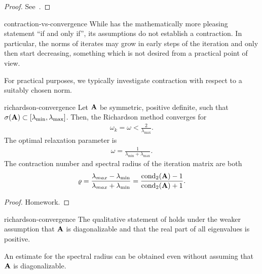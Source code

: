 \begin{proof}
  See~\cite[Theorem 3.1]{Rannacher18nla}.
\end{proof}

\begin{Remark}{contraction-vs-convergence}
  While  has the
  mathematically more pleasing statement ``if and only if'', its
  assumptions do not establish a contraction. In particular, the norms
  of iterates may grow in early steps of the iteration and only then
  start decreasing, something which is not desired from a practical
  point of view.

  For practical purposes, we typically investigate contraction with
  respect to a suitably chosen norm.
\end{Remark}

\begin{Theorem}{richardson-convergence}
  Let $\mathbf A$ be symmetric, positive definite, such that
  $\sigma(\mathbf A)\subset [\lambda_{\min},\lambda_{\max}]$. Then, the Richardson method converges for
  \begin{gather}
    \omega_k = \omega < \frac2{\lambda_{\max}}.
  \end{gather}
  The optimal relaxation parameter is
  \begin{gather}
    \omega = \frac1{\lambda_{\min}+\lambda_{\max}}.
  \end{gather}
  The contraction number and spectral radius of the iteration matrix are both
  \begin{gather}
    \varrho = \frac{\lambda_{max}-\lambda_{\min}}{\lambda_{max}+\lambda_{\min}}
    =\frac{\operatorname{cond}_2(\mathbf A) -1}{\operatorname{cond}_2(\mathbf A) +1}.
  \end{gather}
\end{Theorem}

\begin{proof}
  Homework.
\end{proof}

\begin{Remark}{richardson-convergence}
  The qualitative statement of
   holds under the weaker
  assumption that $\mathbf A$ is diagonalizable and that the real part of
  all eigenvalues is positive.

  An estimate for the spectral radius can be obtained even without
  assuming that $\mathbf A$ is diagonalizable.
\end{Remark}

